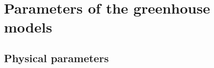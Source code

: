 \chapter{Parameters of the greenhouse models}
\label{cha:param_greenhouse}


\section{Physical parameters}
\label{sec:physical_params}

